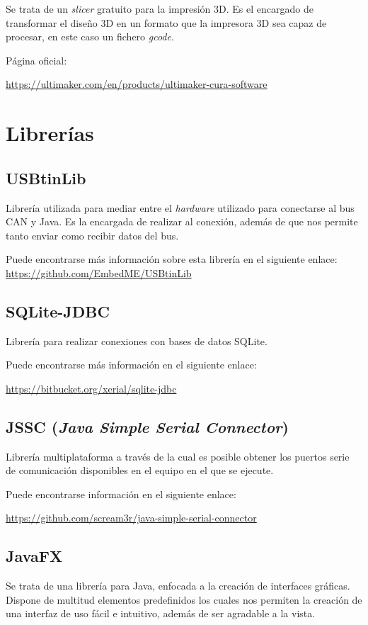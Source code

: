 Se trata de un \emph{slicer}\citep{slicer:3d} gratuito para la impresión 3D. Es el encargado de transformar el diseño 3D en un formato que la impresora 3D sea capaz de procesar, en este caso un fichero \emph{gcode}.

Página oficial:

\url{https://ultimaker.com/en/products/ultimaker-cura-software}

\section{Librerías}\label{librerias}

\subsection{USBtinLib}\label{usbtinlib}

Librería utilizada para mediar entre el \emph{hardware} utilizado para conectarse al bus CAN y Java. Es la encargada de realizar al conexión, además de que nos permite tanto enviar como recibir datos del bus. 

Puede encontrarse más información sobre esta librería en el siguiente enlace:
\url{https://github.com/EmbedME/USBtinLib}

\subsection{SQLite-JDBC}\label{sqlite-jdbc}

Librería para realizar conexiones con bases de datos SQLite.

Puede encontrarse más información en el siguiente enlace: 

\url{https://bitbucket.org/xerial/sqlite-jdbc}

\subsection{JSSC (\emph{Java Simple Serial Connector})}\label{jssc_java_simple_serial_connector}

Librería multiplataforma a través de la cual es posible obtener los puertos serie de comunicación disponibles en el equipo en el que se ejecute.

Puede encontrarse información en el siguiente enlace:

\url{https://github.com/scream3r/java-simple-serial-connector}


\subsection{JavaFX}\label{javafx}
Se trata de una librería para Java, enfocada a la creación de interfaces gráficas. Dispone de multitud elementos predefinidos los cuales nos permiten la creación de una interfaz de uso fácil e intuitivo, además de ser agradable a la vista.

